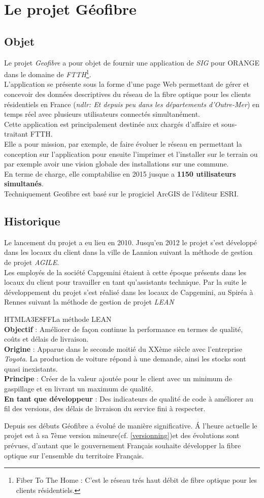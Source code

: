 \chapter{Le projet Géofibre}
\section{Objet}
Le projet \textit{Geofibre} a pour objet de fournir une application de \textit{SIG} pour ORANGE dans le domaine de \textit{FTTH}\footnote{Fiber To The Home : C'est le réseau trés haut débit de fibre optique pour les clients résidentiels.}.\\
L'application se présente sous la forme d'une page Web permettant de gérer et concevoir des données descriptives du réseau de la fibre optique pour les clients résidentiels en France (\textit{ndlr: Et depuis peu dans les départements d'Outre-Mer}) en temps réel avec plusieurs utilisateurs connectés simultanément.\\
Cette application est principalement destinée aux chargés d'affaire et sous-traitant FTTH.\\
Elle a pour mission, par exemple, de faire évoluer le réseau en permettant la conception sur l'application pour ensuite l'imprimer et l'installer sur le terrain ou par exemple avoir une vision globale des installations sur une commune.\\
En terme de charge, elle comptabilise en 2015 jusque a \textbf{1150 utilisateurs simultanés}.\\
Techniquement Geofibre est basé sur le progiciel ArcGIS de l'éditeur ESRI.

\newpage
\section{Historique}
Le lancement du projet a eu lieu en 2010. Jusqu'en 2012 le projet s'est développé dans les locaux du client dans la ville de Lannion suivant la méthode de gestion de projet \textit{AGILE}.\\
Les employés de la société Capgemini étaient à cette époque présents dans les locaux du client pour travailler en tant qu'assistants technique.
Par la suite le développement du projet s'est réalisé dans les locaux de Capgemini, au Spiréa à Rennes suivant la méthode de gestion de projet \textit{LEAN}

\begin{colbox}{{HTML}{A3E8FF}}{La méthode LEAN\\ }
	\textbf{Objectif} : Améliorer de façon continue la performance en termes de qualité, coûts et délais de livraison.
	\\\textbf{Origine} : Apparue dans le seconde moitié du XXème siècle avec l'entreprise \textit{Toyota}. La production de voiture répond à une demande, ainsi les stocks sont quasi inexistants.
	\\\textbf{Principe} : Créer de la valeur ajoutée pour le client avec un minimum de gaspillage et en livrant un maximum de qualité.
	\\\textbf{En tant que développeur} : Des indicateurs de qualité de code à améliorer au fil des versions, des délais de livraison du service fini à respecter.
\end{colbox}

Depuis ses débuts Géofibre a évolué de manière significative. \'A l'heure actuelle le projet est à sa 7ème version mineure(cf. \ref{versionning})et des évolutions sont prévues, d'autant que le gouvernement Français souhaite développer la fibre optique sur l'ensemble du territoire Français.
